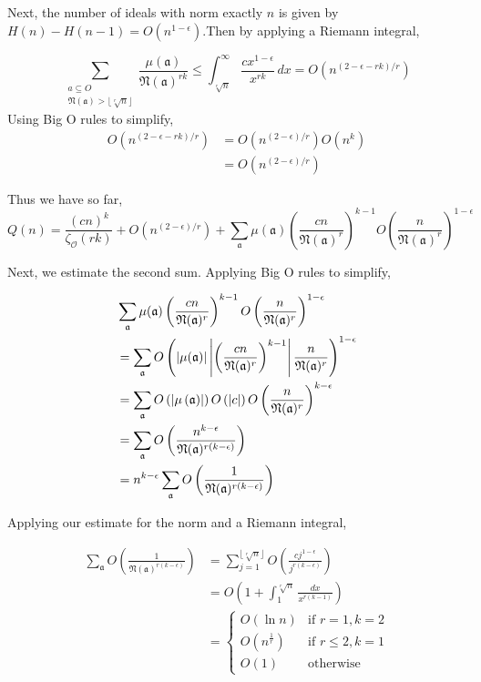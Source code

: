 \documentclass[10pt,a4paper]{article}
\theoremstyle{definition}
\theoremstyle{remark}
\newcommand{\f}[1]{\mathfrak{#1}}
\begin{document}
	Next, the number of ideals with norm exactly \(n\) is given by \(H(n)-H(n-1)=O(n^{1-\epsilon})\).Then by applying a Riemann integral, 
	
	\begin{equation}
		\sum_{\substack{a\subseteq O\\ 
				\f{N}(\f{a}) > \lfloor\sqrt[r]{n}\rfloor}} \frac{\mu(\f{a})}{\f{N}(\f{a})^{rk}} \leq \int_{\sqrt[r]{n}}^{\infty}\frac{cx^{1-\epsilon}}{x^{rk}}\, dx = O(n^{(2-\epsilon-rk)/r})
	\end{equation}
	Using Big O rules to simplify,
	\begin{align}
	 O(n^{(2-\epsilon-rk)/r}) &= O(n^{(2-\epsilon)/r})O(n^{k})\\
	 & =  O(n^{(2-\epsilon)/r})
	\end{align}
	
	Thus we have so far, 
	\begin{equation}
		Q(n)=\frac{(cn)^k}{\zeta_{\mathcal{O}}(rk)}+O(n^{(2-\epsilon)/r}) +\sum_{\f{a}}\mu(\f{a})\left(\frac{cn}{\f{N}(\f{a})^r}\right)^{k-1}O\left(\frac{n}{\f{N}(\f{a})^r}\right)^{1-\epsilon}
	\end{equation}

	Next, we estimate the second sum. Applying Big O rules to simplify, 
	
	\begin{align}	
	&\sum_{\f{a}}\mu(\f{a})\left(\frac{cn}{\f{N}(\f{a})^r}\right)^{k-1}O\left(\frac{n}{\f{N}(\f{a})^r}\right)^{1-\epsilon}\\
	&=\sum_{\f{a}}O\left(\left|\mu(\f{a})\right|\left|\left(\frac{cn}{\f{N}(\f{a})^r}\right)^{k-1}\right|\frac{n}{\f{N}(\f{a})^r}\right)^{1-\epsilon}\notag\\
	&=\sum_{\f{a}}O\left(\left|\mu\left(\f{a}\right)\right|\right)O\left(|c|\right)O\left(\frac{n}{\f{N}(\f{a})^r}\right)^{k-\epsilon}\notag\\
	&=\sum_{\f{a}}O\left(\frac{n^{k-\epsilon}}{\f{N}(\f{a})^{r(k-\epsilon)}}\right)\notag\\
	&= n^{k-\epsilon} \sum_{\f{a}}O\left(\frac{1}{\f{N}(\f{a})^{r(k-\epsilon)}}\right)
	\end{align}

	Applying our estimate for the norm and a Riemann integral, 
	
	\begin{align}
		\sum_{\f{a}}O\left(\frac{1}{\f{N}(\f{a})^{r(k-\epsilon)}}\right) &= \sum_{j=1}^{\lfloor \sqrt[r]{n} \rfloor} O\left(\frac{cj^{1-\epsilon}}{j^{r(k-\epsilon)}}\right)\\
		&= O\left(1+\int_{1}^{\sqrt[r]{n}} \frac{dx}{x^{r(k-1)}}\right)\\
		&= \begin{cases}
			O(\ln n) & \text{if } r=1, k=2 \\
			O(n^\frac{1}{r}) & \text{if } r\leq2, k=1 \\
			O(1) & \text{otherwise}
		\end{cases}
	\end{align}
\end{document}
